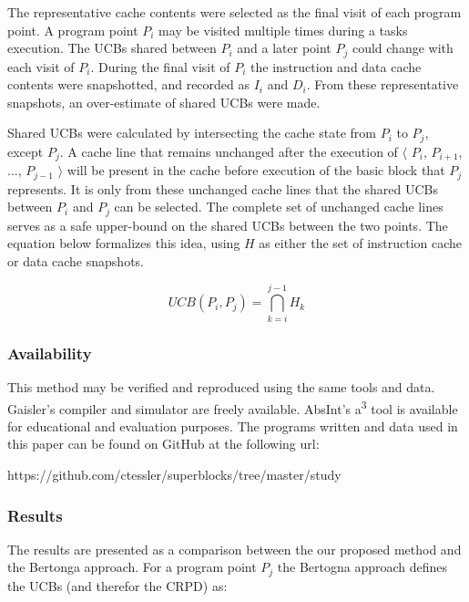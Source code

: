 The representative cache contents were selected as the final visit of
each program point. A program point ${P_i}$ may be visited multiple
times during a tasks execution. The UCBs shared between ${P_i}$ and a
later point ${P_j}$ could change with each visit of ${P_i}$. During
the final visit of ${P_i}$ the instruction and data cache contents
were snapshotted, and recorded as ${I_i}$ and ${D_i}$. From these
representative snapshots, an over-estimate of shared UCBs were made.

Shared UCBs were calculated by intersecting the cache state from ${P_i}$
to ${P_j}$, except ${P_j}$. A cache line that remains unchanged after
the execution of ${\langle}$ ${P_i}$, ${P_{i+1}}$, ..., ${P_{j-1}}$
${\rangle}$ will be
present in the cache before execution of the basic block that ${P_j}$
represents. It is only from these unchanged cache lines that the shared UCBs
between ${P_i}$ and ${P_j}$ can be selected. The complete set of
unchanged cache lines serves as a safe upper-bound on the shared UCBs
between the two points. The equation below formalizes this idea, using
${H}$ as either the set of instruction cache or data cache snapshots.

\begin{center}
  \begin{equation*}
    UCB(P_i, P_j) = \bigcap_{k=i}^{j-1} H_k
  \end{equation*}
\end{center}

\subsubsection{Availability}

This method may be verified and reproduced using the same tools and
data. Gaisler's compiler and simulator are freely available. AbsInt's
a\textsuperscript{3} tool is available for educational and evaluation
purposes. The programs written and data used in this paper can be
found on GitHub at the following url:

\begin{center}
https://github.com/ctessler/superblocks/tree/master/study
\end{center}


\subsubsection{Results}

The results are presented as a comparison between the our proposed
method and the Bertonga approach. For a program point ${P_j}$ the 
Bertogna \cite{bertogna:11} approach defines the UCBs (and therefor the CRPD) as:

